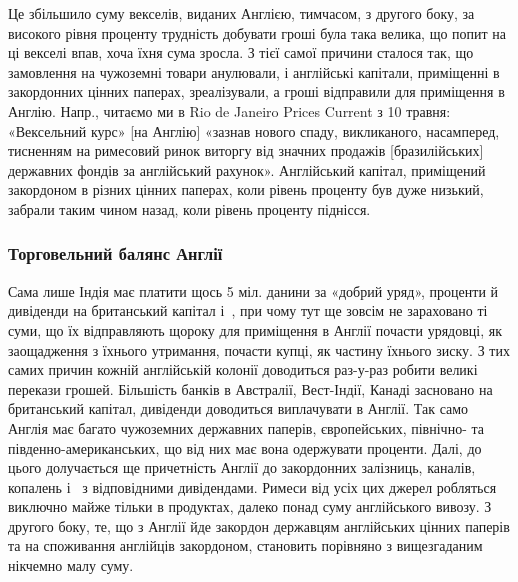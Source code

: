 \parcont{}  %
Це збільшило суму векселів, виданих Англією, тимчасом, з другого боку, за
високого рівня проценту трудність добувати гроші була така велика, що попит
на ці векселі впав, хоча їхня сума зросла. З тієї самої причини сталося так,
що замовлення на чужоземні товари анулювали, і англійські капітали, приміщенні
в закордонних цінних паперах, зреалізували, а гроші відправили для
приміщення в Англію. Напр., читаємо ми в Rio de Janeiro Prices Current з 10
травня: «Вексельний курс» [на Англію] «зазнав нового спаду, викликаного,
насамперед, тисненням на римесовий ринок виторгу від значних продажів [бразилійських]
державних фондів за англійський рахунок». Англійський капітал, приміщений
закордоном в різних цінних паперах, коли рівень проценту був дуже
низький, забрали таким чином назад, коли рівень проценту піднісся.

\subsubsection{Торговельний балянс Англії}

Сама лише Індія має платити щось 5 міл. данини за «добрий уряд»,
проценти й дивіденди на британський капітал і~, при чому тут ще зовсім
не зараховано ті суми, що їх відправляють щороку для приміщення в Англії
почасти урядовці, як заощадження з їхнього утримання, почасти купці, як частину
їхнього зиску. З тих самих причин кожній англійській колонії доводиться
раз-у-раз робити великі перекази грошей. Більшість банків в Австралії, Вест-Індії,
Канаді засновано на британський капітал, дивіденди доводиться виплачувати
в Англії. Так само Англія має багато чужоземних державних паперів, європейських,
північно- та південно-американських, що від них має вона одержувати
проценти. Далі, до цього долучається ще причетність Англії до закордонних
залізниць, каналів, копалень і~ з відповідними дивідендами. Римеси від
усіх цих джерел робляться виключно майже тільки в продуктах, далеко понад
суму англійського вивозу. З другого боку, те, що з Англії йде закордон державцям
англійських цінних паперів та на споживання англійців закордоном, становить
порівняно з вищезгаданим нікчемно малу суму.

